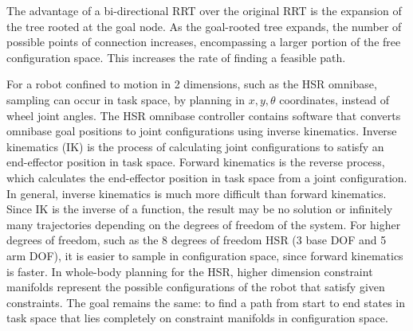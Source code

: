 \documentclass[12pt]{article}
\begin{document}
            \par The advantage of a bi-directional RRT over the original RRT is the expansion of the tree rooted at the goal node. As the goal-rooted tree expands, the number of possible points of connection increases, encompassing a larger portion of the free configuration space. This increases the rate of finding a feasible path.

            For a robot confined to motion in 2 dimensions, such as the HSR omnibase, sampling can occur in task space, by planning in $x,y, \theta$ coordinates, instead of wheel joint angles. The HSR omnibase controller contains software that converts omnibase goal positions to joint configurations using inverse kinematics. Inverse kinematics (IK) is the process of calculating joint configurations to satisfy an end-effector position in task space. Forward kinematics is the reverse process, which calculates the end-effector position in task space from a joint configuration. In general, inverse kinematics is much more difficult than forward kinematics. Since IK is the inverse of a function, the result may be no solution or infinitely many trajectories depending on the degrees of freedom of the system. 
            For higher degrees of freedom, such as the 8 degrees of freedom HSR (3 base DOF and 5 arm DOF), it is easier to sample in configuration space, since forward kinematics is faster. In whole-body planning for the HSR, higher dimension constraint manifolds represent the possible configurations of the robot that satisfy given constraints. The goal remains the same: to find a path from start to end states in task space that lies completely on constraint manifolds in configuration space.
\end{document}
